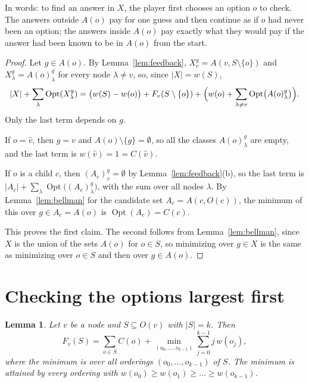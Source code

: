 \documentclass[11pt]{article}
\newtheorem{lemma}[theorem]{Lemma}
\newcommand{\Opt}{\operatorname{Opt}}
\begin{document}
In words: to find an answer in $X$, the player first chooses an option $o$ to
check. The answers outside $A(o)$ pay for one guess and then continue as if $o$
had never been an option; the answers inside $A(o)$ pay exactly what they would
pay if the answer had been known to be in $A(o)$ from the start.

\begin{proof}
  Let $g \in A(o)$. By Lemma~\ref{lem:feedback}, $X^g_v = A(v, S \setminus \{o\})$
  and $X^g_\lambda = A(o)^g_\lambda$ for every node $\lambda \ne v$, so, since
  $|X| = w(S)$,
  \[
    |X| + \sum_\lambda \Opt(X^g_\lambda)
    = \bigl( w(S) - w(o) \bigr) + F_v(S \setminus \{o\})
      + \Bigl( w(o) + \sum_{\lambda \ne v} \Opt\bigl(A(o)^g_\lambda\bigr) \Bigr).
  \]
  Only the last term depends on $g$.

  If $o = \hat v$, then $g = v$ and $A(o) \setminus \{g\} = \emptyset$, so all the
  classes $A(o)^g_\lambda$ are empty, and the last term is $w(\hat v) = 1 =
  C(\hat v)$.

  If $o$ is a child $c$, then $(A_c)^g_v = \emptyset$ by
  Lemma~\ref{lem:feedback}(b), so the last term is
  $|A_c| + \sum_\lambda \Opt\bigl((A_c)^g_\lambda\bigr)$, with the sum over all
  nodes $\lambda$. By Lemma~\ref{lem:bellman} for the candidate set
  $A_c = A(c, O(c))$, the minimum of this over $g \in A_c = A(o)$ is
  $\Opt(A_c) = C(c)$.

  This proves the first claim. The second follows from Lemma~\ref{lem:bellman},
  since $X$ is the union of the sets $A(o)$ for $o \in S$, so minimizing over
  $g \in X$ is the same as minimizing over $o \in S$ and then over $g \in A(o)$.
\end{proof}

\section{Checking the options largest first}
\label{sec:order}

\begin{lemma}
  \label{lem:order}
  Let $v$ be a node and $S \subseteq O(v)$ with $|S| = k$. Then
  \[
    F_v(S) = \sum_{o \in S} C(o)
      + \min_{(o_0, \dots, o_{k-1})} \sum_{j=0}^{k-1} j \, w(o_j),
  \]
  where the minimum is over all orderings $(o_0, \dots, o_{k-1})$ of $S$. The
  minimum is attained by every ordering with
  $w(o_0) \ge w(o_1) \ge \dots \ge w(o_{k-1})$.
\end{lemma}
\end{document}
